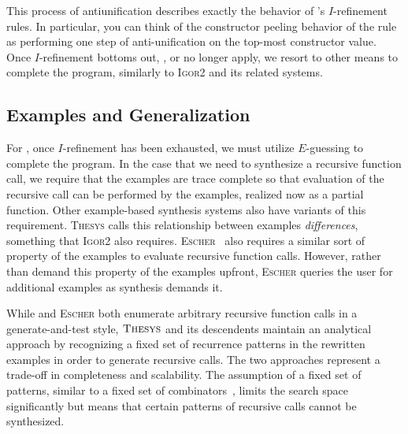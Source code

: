 This process of antiunification describes exactly the behavior of \mlsyn{}'s $I$-refinement rules.
In particular, you can think of the constructor peeling behavior of the  rule as performing one step of anti-unification on the top-most constructor value.
Once $I$-refinement bottoms out, \ie,  or  no longer apply, we resort to other means to complete the program, similarly to \textsc{Igor2} and its related systems.

\subsection{Examples and Generalization}

For \mlsyn{}, once $I$-refinement has been exhausted, we must utilize $E$-guessing to complete the program.
In the case that we need to synthesize a recursive function call, we require that the examples are trace complete so that evaluation of the recursive call can be performed by the examples, realized now as a partial function.
Other example-based synthesis systems also have variants of this requirement.
\textsc{Thesys} calls this relationship between examples \emph{differences}, something that \textsc{Igor2} also requires.
\textsc{Escher}~\citep{albarghouthi-cav-2013} also requires a similar sort of property of the examples to evaluate recursive function calls.
However, rather than demand this property of the examples upfront, \textsc{Escher} queries the user for additional examples as synthesis demands it.

While \mlsyn{} and \textsc{Escher} both enumerate arbitrary recursive function calls in a generate-and-test style, $\textsc{Thesys}$ and its descendents maintain an analytical approach by recognizing a fixed set of recurrence patterns in the rewritten examples in order to generate recursive calls.
The two approaches represent a trade-off in completeness and scalability.
The assumption of a fixed set of patterns, similar to a fixed set of combinators~\citep{feser-pldi-2015}, limits the search space significantly but means that certain patterns of recursive calls cannot be synthesized.
